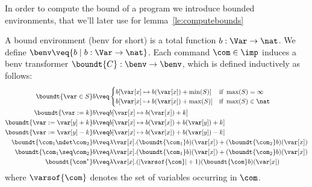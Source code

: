In order to compute the bound of a program we introduce bounded
environments, that we'll later use for lemma~\ref{le:computebounds}

\begin{definition}
  \label{de:boundenv}
  A bound environment (benv for short) is a total function \(b:\Var
  \to \nat\). We define \(\benv \veq \{ b \mid b:\Var \to \nat\}\).
  Each command \(\com\in \imp\) induces a benv transformer
  \(\boundt{C}:\benv \to \benv\), which is defined inductively as
  follows:
  \begin{align*}
    \boundt{\var \in S}b  
    & \veq 
    \begin{cases} 
      b[\var[x]\mapsto b(\var[x])+\min(S)]& \text{if }\max(S)=\infty\\
      b[\var[x]\mapsto b(\var[x])+\max(S)]& \text{if }\max(S)\in \nat
    \end{cases}
    \\
    \boundt{\var := k}b 
    & \veq  b[\var[x]\mapsto b(\var[x])+k]\\
    \boundt{\var := \var[y] + k}b
    & \veq  b[\var[x]\mapsto b(\var[x])+b(\var[y])+k]\\
    \boundt{\var := \var[y] - k}b
    & \veq  b[\var[x]\mapsto b(\var[x]) + b(\var[y]) - k]\\
    \boundt{\com_1 \ndet \com_2}b
    & \veq \lambda \var[x]. (\boundt{\com_1}b)(\var[x]) + (\boundt{\com_2}b)(\var[x])\\
    \boundt{\com_1 \seq \com_2}b
    & \veq \lambda \var[x]. (\boundt{\com_1}b)(\var[x]) + (\boundt{\com_2}b)(\var[x])\\
    \boundt{\com^*}b
    &\veq  \lambda \var[x]. (|\varsof{\com}|+1)(\boundt{\com}b)(\var[x])
  \end{align*}    
  where \(\varsof{\com}\) denotes the set of variables occurring
  in \(\com\).
\end{definition}

